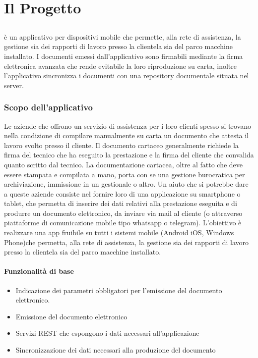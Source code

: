 \newpage
\chapter{Il Progetto}
\label{cap:descrizione-stage}

\section{\app}

\app è un applicativo per dispositivi mobile che permette, alla rete di assistenza, la gestione sia dei rapporti di lavoro presso la clientela sia del parco macchine installato. I documenti emessi dall'applicativo sono firmabili mediante la firma elettronica avanzata che rende evitabile la loro riproduzione su carta, inoltre l'applicativo sincronizza i documenti con una repository documentale situata nel server.

\subsection{Scopo dell'applicativo}
Le aziende che offrono un servizio di assistenza per i loro clienti spesso si trovano nella condizione di compilare manualmente su carta un documento che attesta il lavoro svolto presso il cliente. Il documento cartaceo generalmente richiede la firma del tecnico che ha eseguito la prestazione e la firma del cliente che convalida quanto scritto dal tecnico.
La documentazione cartacea, oltre al fatto che deve essere stampata e compilata a mano, porta con se una gestione burocratica per archiviazione, immissione in un gestionale o altro.
Un aiuto che si potrebbe dare a queste aziende consiste nel fornire loro di una applicazione su smartphone o tablet, che permetta di inserire dei dati relativi alla prestazione eseguita e di produrre un documento elettronico, da inviare via mail al cliente (o attraverso piattaforme di comunicazione mobile tipo whatsapp o telegram).
L'obiettivo è realizzare una app fruibile su tutti i sistemi mobile (Android iOS, Windows Phone)che permetta, alla rete di assistenza, la gestione sia dei rapporti di lavoro presso la clientela sia del parco macchine installato.

\subsubsection{Funzionalità di base}
\begin{itemize}
	\item Indicazione dei parametri obbligatori per l'emissione del documento elettronico.
	\item Emissione del documento elettronico
	\item Servizi REST che espongono i dati necessari all'applicazione
	\item Sincronizzazione dei dati necessari alla produzione del documento
\end{itemize}
